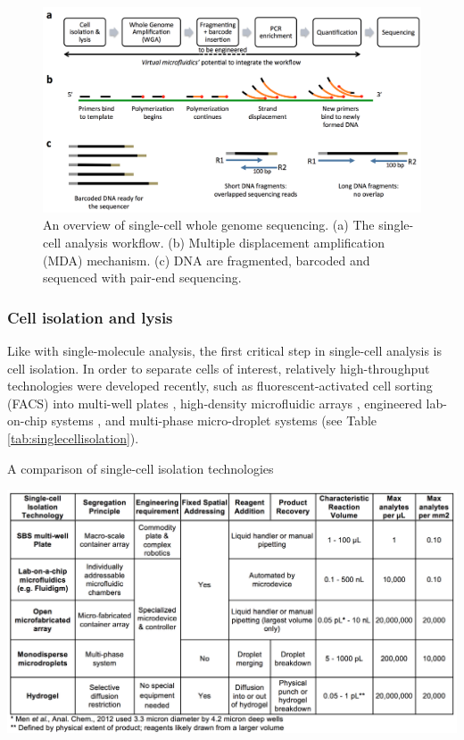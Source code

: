\begin{figure}[ht!]
\centering
\includegraphics[keepaspectratio,width=\textwidth]{./figures/Introduction_Sequencing}
\caption[An overview of single-cell whole genome sequencing]{An overview of single-cell whole genome sequencing. (a) The single-cell analysis workflow. (b) Multiple displacement amplification (MDA) mechanism. (c) DNA are fragmented, barcoded and sequenced with pair-end sequencing.}
\label{fig:Intro}
\end{figure}

\subsubsection{Cell isolation and lysis} 
Like with single-molecule analysis, the first critical step in single-cell analysis is cell isolation. In order to separate cells of interest, relatively high-throughput technologies were developed recently, such as fluorescent-activated cell sorting (FACS) into multi-well plates \cite{Zhang:2006hq}, high-density microfluidic arrays \cite{Love:2013hf}, engineered lab-on-chip systems \cite{Thorsen:2002dn,Landry:2013dh,deBourcy:2014ji, Marcy:2007ip}, and multi-phase micro-droplet systems \cite{Fu:2015gl,Thorsen:2001td,Morinishi:2015jx,Mazutis:2013wn,Hindson:2013hb} (see Table \ref{tab:singlecellisolation}). %

\begin{table}[ht!]
\caption{A comparison of single-cell isolation technologies}
\label{tab:singlecellisolation}
\includegraphics[width=\linewidth]{./figures/TechnologyComparisons.png}
\end{table}

